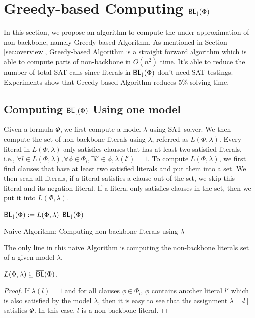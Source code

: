 \section{Greedy-based Computing ${\sf \overline{BL}_\downharpoonright}(\Phi)$} \label{sec:greedy}
In this section, we propose an algorithm to compute the under approximation of non-backbone, namely Greedy-based Algorithm. As mentioned in Section \ref{sec:overview}, Greedy-based Algorithm is a straight forward algorithm which is able to compute parts of non-backbone in $O(n^2)$ time. It's able to reduce the number of total SAT calls since literals in ${\sf \overline{BL}_\downharpoonright}(\Phi)$ don't need SAT testings. Experiments show that Greedy-based Algorithm reduces 5\% solving time.

\subsection{Computing ${\sf \overline{BL}_\downharpoonright}(\Phi)$ Using one model}

Given a formula $\Phi$, we first compute a model $\lambda$ using SAT solver. We then compute the set of non-backbone literals using $\lambda$, referred as $L(\Phi,\lambda)$. Every literal in $L(\Phi,\lambda)$ only satisfies clauses that has at least two satisfied literals, i.e., $\forall l\in L(\Phi,\lambda), \forall \phi\in\Phi_l, \exists l'\in\phi, \lambda(l')=1$.
To compute $L(\Phi,\lambda)$, we first find clauses that have at least two satisfied literals and put them into a set. We then scan all literals, if a literal satisfies a clause out of the set, we skip this literal and its negation literal. If a literal only satisfies clauses in the set, then we put it into $L(\Phi,\lambda)$.

\begin{algorithm2e}
\SetAlgoShortEnd
\SetFillComment
{}
${\sf \overline{BL}_\downharpoonright}(\Phi):=L(\Phi,\lambda)$\;
\Return ${\sf \overline{BL}_\downharpoonright}(\Phi)$\;
\caption{Naive Algorithm: Computing non-backbone literals using $\lambda$}
\label{alg:greedy}
\end{algorithm2e}

The only line in this naive Algorithm is computing the non-backbone literals set of a given model $\lambda$.

\begin{theorem} \label{lem:navie}
 $L(\Phi,\lambda)\subseteq\overline{\textsf{BL}}(\Phi)$.
\end{theorem}

\begin{proof}
If $\lambda(l)=1$ and for all clauses $\phi\in\Phi_l$, $\phi$ contains another literal $l'$ which is also satisfied by the model $\lambda$, then it is easy to see that
the assignment $\lambda[\neg l]$ satisfies $\Phi$.
In this case, $l$ is a non-backbone literal.
\end{proof}

